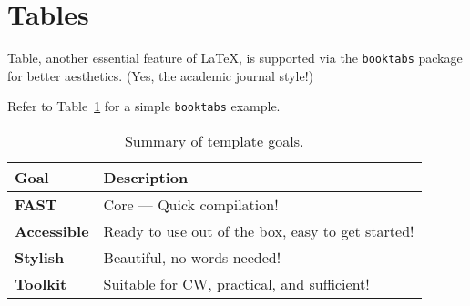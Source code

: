 \section{Tables}

Table, another essential feature of {\LaTeX}, is supported via the \texttt{booktabs} package for better aesthetics. (Yes, the academic journal style!)

Refer to Table~\ref{tab:summary} for a simple \texttt{booktabs} example.

\begin{table}[htbp]
  \centering
  \caption{Summary of template goals.}
  \label{tab:summary}
  \begin{tabular}{@{}ll@{}}
    \toprule
    Goal & Description \\
    \midrule
    \textbf{FAST} & Core — Quick compilation! \\
    \textbf{Accessible} & Ready to use out of the box, easy to get started! \\
    \textbf{Stylish} & Beautiful, no words needed! \\
    \textbf{Toolkit} & Suitable for CW, practical, and sufficient! \\
    \bottomrule
  \end{tabular}
\end{table}
